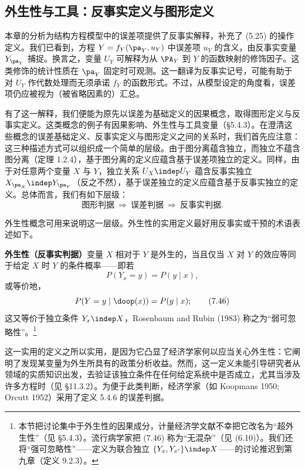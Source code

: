 \subsection{外生性与工具：反事实定义与图形定义}

本章的分析为结构方程模型中的误差项提供了反事实解释，补充了 \textup{(5.25)} 的操作定义。我们已看到，方程 $Y=f_Y(\pa_Y,u_Y)$ 中误差项 $u_Y$ 的含义，由反事实变量 $Y_{\pa_Y}$ 捕捉。换言之，变量 $U_Y$ 可解释为从 $\PA_Y$ 到 $Y$ 的函数映射的修饰因子。这类修饰的统计性质在 $\pa_Y$ 固定时可观测。这一翻译为反事实记号，可能有助于对 $U_Y$ 作代数处理而无须承诺 $f_Y$ 的函数形式。不过，从模型设定的角度看，误差项仍应被视为（被省略因素的）汇总。

有了这一解释，我们便能为原先以误差为基础定义的因果概念，取得图形定义与反事实定义。这类概念的例子有因果影响、外生性与工具变量（\S 5.4.3）。在澄清这些概念的误差基础定义、反事实定义与图形定义之间的关系时，我们首先应注意：这三种描述方式可以组织成一个简单的层级。由于图分离蕴含独立，而独立不蕴含图分离（定理 1.2.4），基于图分离的定义应蕴含基于误差项独立的定义。同样，由于对任意两个变量 $X$ 与 $Y$，独立关系 $U_X\indep U_Y$ 蕴含反事实独立 $X_{\pa_X}\indep Y_{\pa_Y}$（反之不然），基于误差独立的定义应蕴含基于反事实独立的定义。总体而言，我们有如下层级：
\[
\text{图形判据}\ \Longrightarrow\ \text{误差判据}\ \Longrightarrow\ \text{反事实判据}.
\]

外生性概念可用来说明这一层级。外生性的实用定义最好用反事实或干预的术语表述如下。

\medskip
\noindent\textbf{外生性（反事实判据）}\quad 变量 $X$ 相对于 $Y$ 是外生的，当且仅当 $X$ 对 $Y$ 的效应等同于给定 $X$ 时 $Y$ 的条件概率——即若
\begin{equation}
P(Y_x=y)=P(y\mid x), \tag{7.45}
\end{equation}
或等价地，
\begin{equation}
P(Y=y\mid\doop(x))=P(y\mid x); \tag{7.46}
\end{equation}
这又等价于独立条件 $Y_x\indep X$，Rosenbaum and Rubin (1983) 称之为“弱可忽略性”。\footnote{本节把讨论集中于外生性的因果成分，计量经济学文献不幸把它改名为“超外生性”（见 \S 5.4.3）。流行病学家把 \textup{(7.46)} 称为“无混杂”（见 \textup{(6.10)}）。我们还将“强可忽略性”——定义为联合独立 $\{Y_x,Y_{x'}\}\indep X$——的讨论推迟到第九章（定义 9.2.3）。}

这一实用的定义之所以实用，是因为它凸显了经济学家何以应当关心外生性：它阐明了发现某变量为外生所具有的政策分析收益。然而，这一定义未能引导研究者从领域的实质知识出发，去验证该独立条件在任何给定系统中是否成立，尤其当涉及许多方程时（见 \S 11.3.2）。为便于此类判断，经济学家（如 Koopmans 1950; Orcutt 1952）采用了定义 5.4.6 的误差判据。

